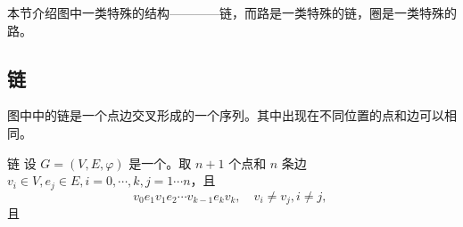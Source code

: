 
本节介绍图中一类特殊的结构————链，而路是一类特殊的链，圈是一类特殊的路。

\subsection{链}
图中中的链是一个点边交叉形成的一个序列。其中出现在不同位置的点和边可以相同。

\begin{definition}{链}
设 $G=(V,E,\varphi)$ 是一个。取 $n+1$ 个点和 $n$ 条边 $v_i\in V,e_j\in E,i=0,\cdots,k,j=1\cdots n$，且
\begin{equation}
v_0 e_1v_1e_2\cdots v_{k-1} e_kv_k,\quad v_i\neq v_j,i\neq j,~
\end{equation}
且
\end{definition}















